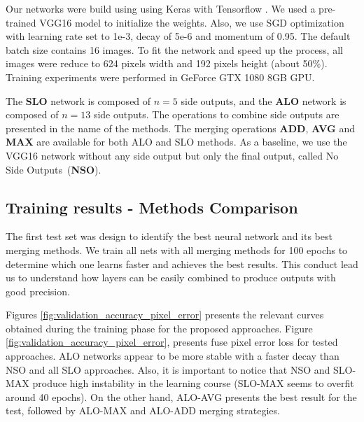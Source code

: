 Our networks were build using using Keras \cite{chollet2015keras} with Tensorflow \cite{tensorflow2015-whitepaper}. We used a pre-trained VGG16 model to initialize the weights. Also, we use SGD optimization with learning rate set to 1e-3, decay of 5e-6 and momentum of 0.95. The default batch size contains 16 images. To fit the network and speed up the process, all images were reduce to 624 pixels width and 192 pixels height (about 50\%). Training experiments were performed in GeForce GTX 1080 8GB GPU.

The \textbf{SLO} network is composed of $n=5$ side outputs, and the \textbf{ALO} network is composed of $n=13$ side outputs. 
The operations to combine side outputs are presented in the name of the methods. The merging operations \textbf{ADD}, \textbf{AVG} and \textbf{MAX} are available for both ALO and SLO methods.
As a baseline, we use the VGG16 network without any side output but only the final output, called No Side Outputs~(\textbf{NSO}).

\subsection{Training results - Methods Comparison}

The first test set was design to identify the best neural network and its best merging methods. We train all nets with all merging methods for 100 epochs to determine which one learns faster and achieves the best results. This conduct lead us to understand how layers can be easily combined to produce outputs with good precision.

Figures \ref{fig:validation_accuracy_pixel_error} presents the relevant curves obtained during the training phase for the proposed approaches. Figure \ref{fig:validation_accuracy_pixel_error}, presents fuse pixel error loss for tested approaches. ALO networks appear to be more stable with a faster decay than NSO and all SLO approaches. Also, it is important to notice that NSO and SLO-MAX produce high instability in the learning course (SLO-MAX seems to overfit around 40 epochs). On the other hand, ALO-AVG presents the best result for the test, followed by ALO-MAX and ALO-ADD merging strategies.

